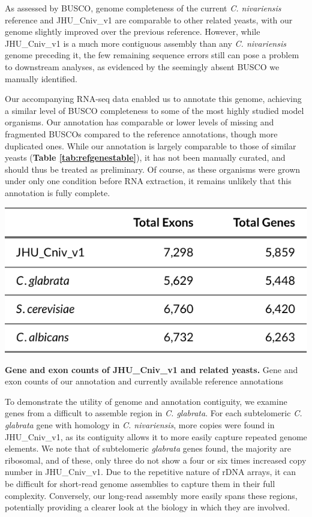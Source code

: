As assessed by BUSCO, genome completeness of the current \textit{C. nivariensis} reference and JHU\_Cniv\_v1 are comparable to other related yeasts, with our genome slightly improved over the previous reference. However, while JHU\_Cniv\_v1 is a much more contiguous assembly than any \textit{C. nivariensis} genome preceding it, the few remaining sequence errors still can pose a problem to downstream analyses, as evidenced by the seemingly absent BUSCO we manually identified.

Our accompanying RNA-seq data enabled us to annotate this genome, achieving a similar level of BUSCO completeness to some of the most highly studied model organisms. Our annotation has comparable or lower levels of missing and fragmented BUSCOs compared to the reference annotations, though more duplicated ones. While our annotation is largely comparable to those of similar yeasts ({\bf Table \ref{tab:refgenestable}}), it has not been manually curated, and should thus be treated as preliminary. Of course, as these organisms were grown under only one condition before RNA extraction, it remains unlikely that this annotation is fully complete.

\begin{table}[!ht]
\centering
\includegraphics[width = .75\linewidth,keepaspectratio]{figure/refgenestable.pdf}
\caption[Gene and exon counts of JHU\_Cniv\_v1 and related yeasts]{{\bf Gene and exon counts of JHU\_Cniv\_v1 and related yeasts.} Gene and exon counts of our annotation and currently available reference annotations }
\label{tab:refgenestable}
\end{table}


To demonstrate the utility of genome and annotation contiguity, we examine genes from a difficult to assemble region in \textit{C. glabrata}. For each subtelomeric \textit{C. glabrata} gene with homology in \textit{C. nivariensis}, more copies were found in JHU\_Cniv\_v1, as its contiguity allows it to more easily capture repeated genome elements. We note that of subtelomeric \textit{glabrata} genes found, the majority are ribosomal, and of these, only three do not show a four or six times increased copy number in JHU\_Cniv\_v1. Due to the repetitive nature of rDNA arrays, it can be difficult for short-read genome assemblies to capture them in their full complexity. Conversely, our long-read assembly more easily spans these regions, potentially providing a clearer look at the biology in which they are involved.

